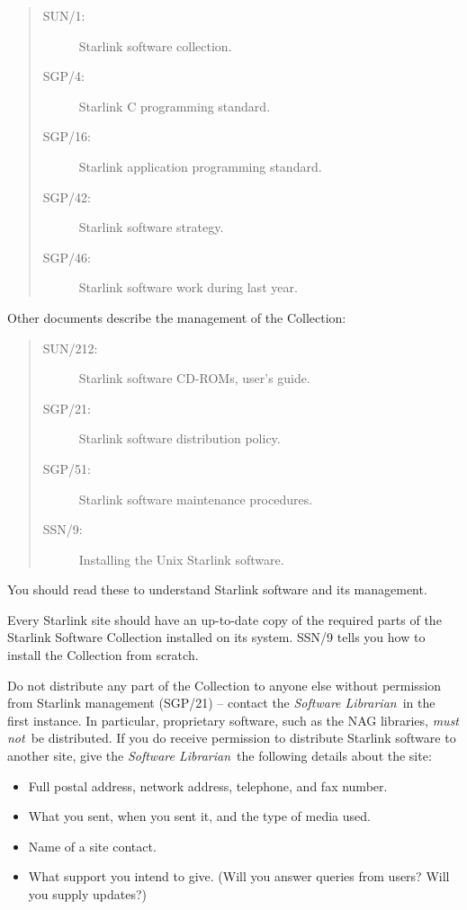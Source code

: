 \documentclass[twoside,11pt]{article}
\newcommand{\xref}[3]{#1}
\begin{document}
\begin{quote}
\begin{description}
\item [\xref{SUN/1:}{sun1}{}] Starlink software collection.
\item [\xref{SGP/4:}{sgp4}{}] Starlink C programming standard.
\item [\xref{SGP/16:}{sgp16}{}] Starlink application programming standard.
\item [\xref{SGP/42:}{sgp42}{}] Starlink software strategy.
\item [\xref{SGP/46:}{sgp46}{}] Starlink software work during last year.
\end{description}
\end{quote}

Other documents describe the management of the Collection:

\begin{quote}
\begin{description}
\item [\xref{SUN/212:}{sun212}{}] Starlink software CD-ROMs, user's guide.
\item [\xref{SGP/21:}{sgp21}{}] Starlink software distribution policy.
\item [\xref{SGP/51:}{sgp51}{}] Starlink software maintenance procedures.
\item [\xref{SSN/9:}{ssn9}{}] Installing the Unix Starlink software.
\end{description}
\end{quote}

You should read these to understand Starlink software and its management.
 
Every Starlink site should have an
up-to-date copy of the required parts of the Starlink Software Collection
installed on its system.
\xref{SSN/9}{ssn9}{}
tells you how to install the Collection from scratch.

Do not distribute any part of the Collection to anyone else without
permission from Starlink management 
(\xref{SGP/21}{sgp21}{}) --
contact the {\em Software Librarian}\, in the first instance.
In particular, proprietary software, such as the NAG libraries, {\em must not}\,
be distributed.
If you do receive permission to distribute Starlink software to another site,
give the {\em Software Librarian}\, the following details about the site:

\begin{itemize}
\item Full postal address, network address, telephone, and fax number.
\item What you sent, when you sent it, and the type of media used.
\item Name of a site contact.
\item What support you intend to give.
 (Will you answer queries from users?
 Will you supply updates?)
\end{itemize}
\end{document}

